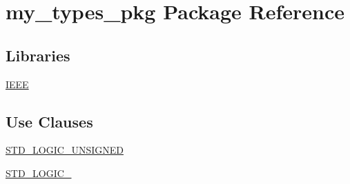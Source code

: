 \hypertarget{classmy__types__pkg}{}\section{my\+\_\+types\+\_\+pkg Package Reference}
\label{classmy__types__pkg}
\subsection*{Libraries}
 \begin{DoxyCompactItemize}
\item 
\hyperlink{classmy__types__pkg_ae4f03c286607f3181e16b9aa12d0c6d4}{I\+E\+E\+E} 
\end{DoxyCompactItemize}
\subsection*{Use Clauses}
 \begin{DoxyCompactItemize}
\item 
\hyperlink{classmy__types__pkg_a241c3e72dd8024cc8ae831b1b2aed7db}{S\+T\+D\+\_\+\+L\+O\+G\+I\+C\+\_\+\+U\+N\+S\+I\+G\+N\+E\+D}   
\item 
\hyperlink{classmy__types__pkg_aa4b2b25246a821511120e3149b003563}{S\+T\+D\+\_\+\+L\+O\+G\+I\+C\+\_}   
\end{DoxyCompactItemize}

